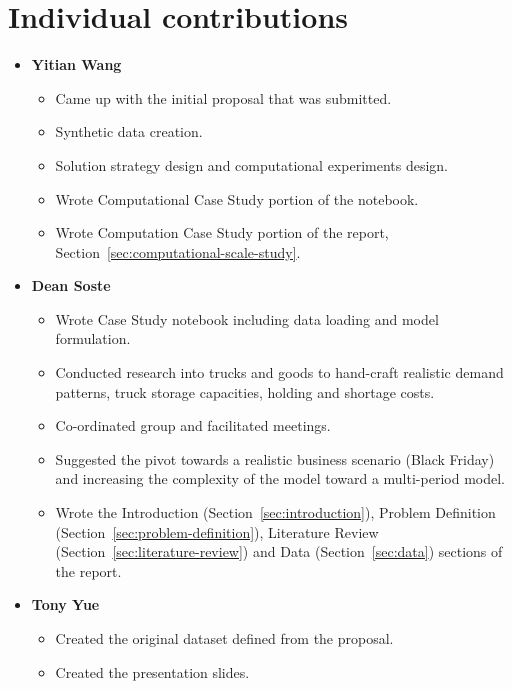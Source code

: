 \documentclass[a4paper,12pt]{article}
\begin{document}
\section{Individual contributions}\label{sec:individual-contributions}
\begin{itemize}
    \item \textbf{Yitian Wang}
    \begin{itemize}
        \item Came up with the initial proposal that was submitted.
        \item Synthetic data creation.
        \item Solution strategy design and computational experiments design.
        \item Wrote Computational Case Study portion of the notebook.
        \item Wrote Computation Case Study portion of the report, Section~\ref{sec:computational-scale-study}.
    \end{itemize}

    \item \textbf{Dean Soste}
    \begin{itemize}
        \item Wrote Case Study notebook including data loading and model formulation.
        \item Conducted research into trucks and goods to hand-craft realistic demand patterns, truck storage capacities, holding and shortage costs.
        \item Co-ordinated group and facilitated meetings.
        \item Suggested the pivot towards a realistic business scenario (Black Friday) and increasing the complexity of the model toward a multi-period model.
        \item Wrote the Introduction (Section~\ref{sec:introduction}), Problem Definition (Section~\ref{sec:problem-definition}), Literature Review (Section~\ref{sec:literature-review}) and Data (Section~\ref{sec:data}) sections of the report.
    \end{itemize}

    \item \textbf{Tony Yue}
    \begin{itemize}
        \item Created the original dataset defined from the proposal.
        \item Created the presentation slides.
    \end{itemize}


\end{itemize}
\end{document}
